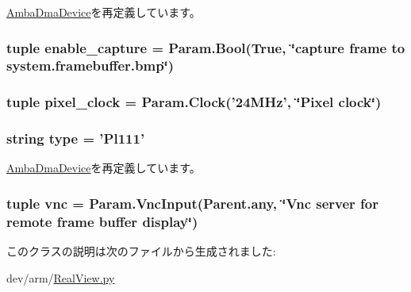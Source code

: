 \hyperlink{classRealView_1_1AmbaDmaDevice_a17da7064bc5c518791f0c891eff05fda}{AmbaDmaDevice}を再定義しています。\hypertarget{classRealView_1_1Pl111_ad54ef6219008e06976486cb101465f9d}{
\subsubsection[{enable\_\-capture}]{\setlength{\rightskip}{0pt plus 5cm}tuple {\bf enable\_\-capture} = Param.Bool(True, \char`\"{}capture frame to system.framebuffer.bmp\char`\"{})}}
\label{classRealView_1_1Pl111_ad54ef6219008e06976486cb101465f9d}
\hypertarget{classRealView_1_1Pl111_a1c05724bfa7560d233706f5367017198}{
\subsubsection[{pixel\_\-clock}]{\setlength{\rightskip}{0pt plus 5cm}tuple {\bf pixel\_\-clock} = Param.Clock('24MHz', \char`\"{}Pixel clock\char`\"{})}}
\label{classRealView_1_1Pl111_a1c05724bfa7560d233706f5367017198}
\hypertarget{classRealView_1_1Pl111_acce15679d830831b0bbe8ebc2a60b2ca}{
\subsubsection[{type}]{\setlength{\rightskip}{0pt plus 5cm}string {\bf type} = '{\bf Pl111}'}}
\label{classRealView_1_1Pl111_acce15679d830831b0bbe8ebc2a60b2ca}


\hyperlink{classRealView_1_1AmbaDmaDevice_acce15679d830831b0bbe8ebc2a60b2ca}{AmbaDmaDevice}を再定義しています。\hypertarget{classRealView_1_1Pl111_afe937f4b2d4f6f3abce13db1d308617d}{
\subsubsection[{vnc}]{\setlength{\rightskip}{0pt plus 5cm}tuple {\bf vnc} = Param.VncInput(Parent.any, \char`\"{}Vnc server for remote frame buffer display\char`\"{})}}
\label{classRealView_1_1Pl111_afe937f4b2d4f6f3abce13db1d308617d}


このクラスの説明は次のファイルから生成されました:\begin{DoxyCompactItemize}
\item 
dev/arm/\hyperlink{RealView_8py}{RealView.py}\end{DoxyCompactItemize}
